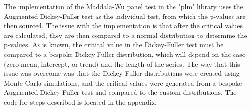 The implementation of the Maddala-Wu panel test in the "plm" library uses the Augmented Dickey-Fuller test as the individual test, from which the p-values are then sourced. The issue with the implementation is that after the critical values are calculated, they are then compared to a normal distribution to determine the p-values. As is known, the critical value in the Dickey-Fuller test must be compared to a bespoke Dickey-Fuller distribution, which will depend on the case (zero-mean, intercept, or trend) and the length of the series. The way that this issue was overcome was that the Dickey-Fuller distributions were created using Monte-Carlo simulations, and the critical values were generated from a bespoke Augmented Dickey-Fuller test and compared to the custom distributions. The code for steps described is located in the appendix.




